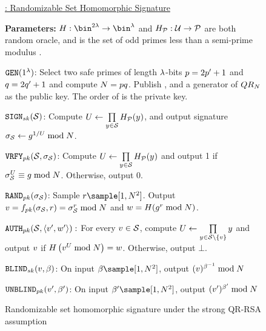 \begin{figure}
\begin{mdframed}
\footnotesize
\underline{\ourSigScheme: Randomizable Set Homomorphic Signature}

\textbf{Parameters:} $\ro: \bin^{2\secParam} \rightarrow \bin^{\secParam}$ and $H_{\mathcal{P}}: \mathcal{U} \rightarrow \mathcal{P}$  are both random oracle, and \primes is the set of odd primes less than a semi-prime modulus \rsaMod.


\itemListStart

	\item $\keyGen(1^{\secParam})$: Select two safe primes of length 
	$\lambda$-bits $\safePrime[1] = 2 \sgPrime[1] + 1$ and 
	$\safePrime[2] = 2 \sgPrime[2] + 1$ and compute $\rsaMod = \safePrime[1] 
	\safePrime[2]$. Publish \rsaMod, and a generator \qrGen of $QR_{N}$ as the public key. 
	The order of \qrGroup is the private key. 
	
	\item \textbf{$\signingAlg[\privKey](\genericSetVar)$}: Compute $\accSet \assign \accSetDefn$, and output signature 
	 $\genericSig[\genericSetVar] \assign 
	\qrGen^{1/\accSet} \bmod \rsaMod$. 

	\item \textbf{$\verify[\pubKey](\genericSetVar, \genericSig[\genericSetVar])$}: Compute $\accSet \assign \accSetDefn$ and 
	output 1 if
	$\genericSig[\genericSetVar]^{\accSet} \equiv \qrGen \bmod 
	\rsaMod$. Otherwise, output 0. 
			
	\item \textbf{$\randomize[\pubKey](\genericSig[\genericSetVar])$}: Sample $\genericRand \sample \nats[1][\rsaMod^2]$. 
	Output $\genericSigPair[1] = \randomizeFn[\pubKey](\genericSig[\genericSetVar], \genericRand) = 
	\genericSig[\genericSetVar]^{\genericRand} \bmod \rsaMod$ and $\genericSigPair[2] = 
	\ro(\qrGen^{\genericRand} \bmod \rsaMod)$. 
	
	
	\item \textbf{$\verifyRand[\pubKey](\genericSetVar, \genericSigPairAlt):$} For every $\genericSigPair[1] \in \genericSetVar$, compute $\accSet \assign \prod\limits_{\genericCInputElmt \in \genericSetVar \setminus \{ \genericSigPair[1] \}} \genericCInputElmt$ and 
	output $\genericSigPair[1]$ if $\ro\left(\genericSigPair[1]^{\accSet} \bmod \rsaMod\right) = \genericSigPair[2]$. Otherwise, output $\bot$. 

    \item $\blind[\privKey](\genericSigPair[1], \blindingFactor)$: On input  $\blindingFactor \sample [1, \rsaMod^2]$, output $(\genericSigPair[1])^{\blindingFactor^{-1}} \bmod \rsaMod$

    \item $\unblind[\pubKey](\genericSigPairAlt[1], \blindingFactor')$: On input  $\blindingFactor' \sample [1, \rsaMod^2]$, output $(\genericSigPairAlt[1])^{\blindingFactor'} \bmod \rsaMod$  
        
\itemListEnd
\end{mdframed}
\vspace{-0.3cm}
\caption{Randomizable set homomorphic signature under the strong QR-RSA assumption\label{sig:construction}}
\end{figure}

